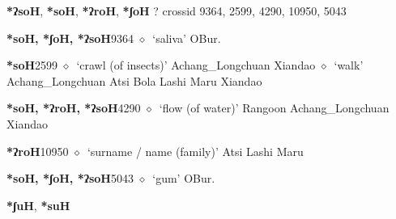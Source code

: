 \item
\textbf{*ʔsoH}, \textbf{*soH}, \textbf{*ʔroH}, \textbf{*ʃoH}
?
  {\tiny crossid 9364, 2599, 4290, 10950, 5043}
  \begin{list}{}{\leftmargin=1.5em \itemindent=-1.5em}
  \item {\footnotesize \textbf{*soH, *ʃoH, *ʔsoH}}{\tiny 9364}
         $\diamond$~`saliva'
         OBur. 
  \item {\footnotesize \textbf{*soH}}{\tiny 2599}
\hspace{1ex}
         $\diamond$~`crawl (of insects)'
         Achang\_Longchuan 
\hspace{1ex}
         Xiandao 
\hspace{1ex}
         $\diamond$~`walk'
         Achang\_Longchuan 
\hspace{1ex}
         Atsi 
\hspace{1ex}
         Bola 
\hspace{1ex}
         Lashi 
\hspace{1ex}
         Maru 
\hspace{1ex}
         Xiandao 
  \item {\footnotesize \textbf{*soH, *ʔroH, *ʔsoH}}{\tiny 4290}
\hspace{1ex}
         $\diamond$~`flow (of water)'
         Rangoon 
\hspace{1ex}
         Achang\_Longchuan 
\hspace{1ex}
         Xiandao 
  \item {\footnotesize \textbf{*ʔroH}}{\tiny 10950}
\hspace{1ex}
         $\diamond$~`surname / name (family)'
         Atsi 
\hspace{1ex}
         Lashi 
\hspace{1ex}
         Maru 
  \item {\footnotesize \textbf{*soH, *ʃoH, *ʔsoH}}{\tiny 5043}
\hspace{1ex}
         $\diamond$~`gum'
         OBur. 
  \end{list}
\item
\textbf{*ʃuH}, \textbf{*suH}
